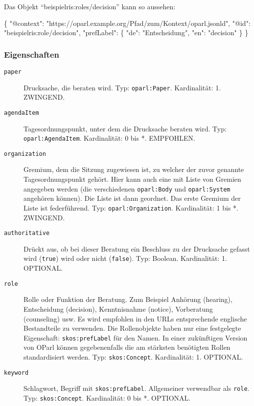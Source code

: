 \documentclass[,a4paper]{article}
\newenvironment{Shaded}{}{}
\newcommand{\DataTypeTok}[1]{\textcolor[rgb]{0.56,0.13,0.00}{{#1}}}
\newcommand{\StringTok}[1]{\textcolor[rgb]{0.25,0.44,0.63}{{#1}}}
\newcommand{\FunctionTok}[1]{\textcolor[rgb]{0.02,0.16,0.49}{{#1}}}
\begin{document}
Das Objekt ``beispielris:roles/decision'' kann so aussehen:

\begin{Shaded}
\begin{Highlighting}[]
\FunctionTok{\{}
    \DataTypeTok{"@context"}\FunctionTok{:} \StringTok{"https://oparl.example.org/Pfad/zum/Kontext/oparl.jsonld"}\FunctionTok{,}
    \DataTypeTok{"@id"}\FunctionTok{:} \StringTok{"beispielris:role/decision"}\FunctionTok{,}
    \DataTypeTok{"prefLabel"}\FunctionTok{:} \FunctionTok{\{}
        \DataTypeTok{"de"}\FunctionTok{:} \StringTok{"Entscheidung"}\FunctionTok{,}
        \DataTypeTok{"en"}\FunctionTok{:} \StringTok{"decision"}
    \FunctionTok{\}}
\FunctionTok{\}}
\end{Highlighting}
\end{Shaded}

\subsubsection{Eigenschaften}\label{eigenschaften-8}

\begin{description}
\item[\texttt{paper}]
Drucksache, die beraten wird. Typ: \texttt{oparl:Paper}. Kardinalität:
1. ZWINGEND.
\item[\texttt{agendaItem}]
Tagesordnungspunkt, unter dem die Drucksache beraten wird. Typ:
\texttt{oparl:AgendaItem}. Kardinalität: 0 bis *. EMPFOHLEN.
\item[\texttt{organization}]
Gremium, dem die Sitzung zugewiesen ist, zu welcher der zuvor genannte
Tagesordnungspunkt gehört. Hier kann auch eine mit Liste von Gremien
angegeben werden (die verschiedenen \texttt{oparl:Body} und
\texttt{oparl:System} angehören können). Die Liste ist dann geordnet.
Das erste Gremium der Liste ist federführend. Typ:
\texttt{oparl:Organization}. Kardinalität: 1 bis *. ZWINGEND.
\item[\texttt{authoritative}]
Drückt aus, ob bei dieser Beratung ein Beschluss zu der Drucksache
gefasst wird (\texttt{true}) wird oder nicht (\texttt{false}). Typ:
Boolean. Kardinalität: 1. OPTIONAL.
\item[\texttt{role}]
Rolle oder Funktion der Beratung. Zum Beispiel Anhörung (hearing),
Entscheidung (decision), Kenntnisnahme (notice), Vorberatung
(counseling) usw. Es wird empfohlen in den URLs entsprechende englische
Bestandteile zu verwenden. Die Rollenobjekte haben nur eine festgelegte
Eigenschaft: \texttt{skos:prefLabel} für den Namen. In einer zukünftigen
Version von OParl können gegebenenfalls die am stärksten benötigten
Rollen standardisiert werden. Typ: \texttt{skos:Concept}. Kardinalität:
1. OPTIONAL.
\item[\texttt{keyword}]
Schlagwort, Begriff mit \texttt{skos:prefLabel}. Allgemeiner verwendbar
als \texttt{role}. Typ: \texttt{skos:Concept}. Kardinalität: 0 bis *.
OPTIONAL.
\end{description}
\end{document}
